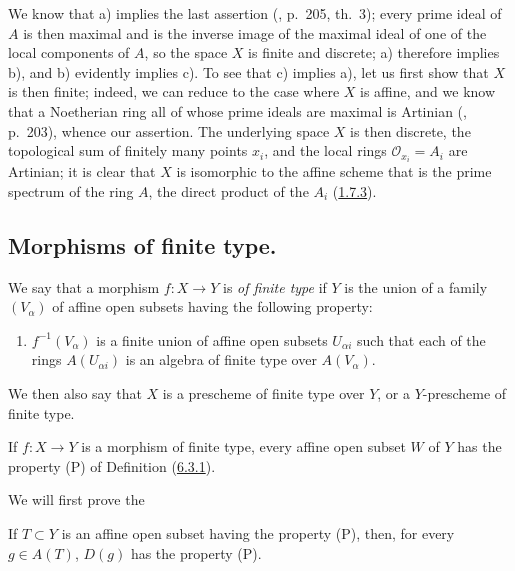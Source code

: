 We know that a) implies the last assertion (\cite{I-13}, p.~205, th.~3);
every prime ideal of $A$ is then maximal and is the inverse image of the
maximal ideal of one of the local components of $A$, so the space $X$ is
finite and discrete; a) therefore implies b), and b) evidently implies c). To
see that c) implies a), let us first show that $X$ is then finite; indeed, we
can reduce to the case where $X$ is affine, and we know that a Noetherian
ring all of whose prime ideals are maximal is Artinian (\cite{I-13}, p.~203),
whence our assertion. The underlying space $X$ is then discrete, the
topological sum of finitely many points $x_i$, and the local rings
$\mathscr{O}_{x_i}=A_i$ are Artinian; it is clear that $X$ is isomorphic to
the affine scheme that is the prime spectrum of the ring $A$, the direct
product of the $A_i$ (\hyperref[I.1.7.3]{1.7.3}).

\subsection{Morphisms of finite type.}
\label{subsection:I.6.3}

\begin{definition}[6.3.1]
\label{I.6.3.1}
We say that a morphism $f:X\to Y$ is \emph{of finite type} if $Y$ is the union
of a family $(V_\alpha)$ of affine open subsets having the following property:
\begin{enumerate}
  \item[(P)] $f^{-1}(V_\alpha)$ is a finite union of affine open subsets
    $U_{\alpha i}$ such that each of the rings $A(U_{\alpha i})$ is an
    algebra of finite type over $A(V_\alpha)$.
\end{enumerate}
We then also say that $X$ is a prescheme of finite type over $Y$, or a
$Y$-prescheme of finite type.
\end{definition}

\begin{proposition}[6.3.2]
\label{I.6.3.2}
If $f:X\to Y$ is a morphism of finite type, every affine open subset $W$ of
$Y$ has the property (P) of Definition (\hyperref[I.6.3.1]{6.3.1}).
\end{proposition}

We will first prove the

\begin{lemma}[6.3.2.1]
\label{I.6.3.2.1}
If $T\subset Y$ is an affine open subset having the property (P), then, for
every $g\in A(T)$, $D(g)$ has the property (P).
\end{lemma}

